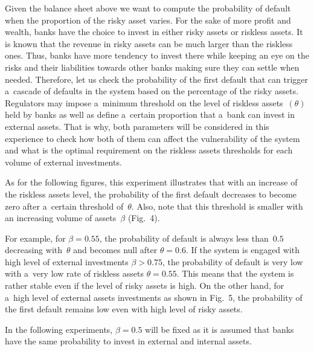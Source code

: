 \begin{multicols}{2}
\noindent
Given the balance sheet above we want to compute the probability of default when 
the proportion of the risky asset varies.
For the sake of more profit and wealth, banks have the choice to invest in 
either risky assets or riskless assets. It is known that the revenue in risky 
assets can be much larger than the riskless ones. Thus, banks have more tendency to 
invest there while keeping an eye on the risks and their liabilities towards 
other banks making sure they can settle when needed. Therefore, let us check 
the probability of the first default that can trigger a~cascade of defaults in the 
system based on the percentage of the risky assets. Regulators may impose 
a~minimum threshold on the level of riskless assets~$(\theta)$ held by banks as 
well as define a~certain proportion that a~bank can invest in  external assets. 
That is why, both parameters will be considered in this experience to check how 
both of them can affect the vulnerability of the system and what is the optimal 
requirement on the riskless assets thresholds for each volume of external 
investments.

As for the following figures, this experiment illustrates that with an increase 
of the riskless assets level, the probability of the first default decreases to 
become zero after a~certain threshold of~$\theta.$
Also, note that this threshold is smaller with an increasing volume of 
assets~$\beta$ (Fig.~4).

For example, for $\beta = 0.55 $, the probability of default is always less 
than~$0.5$ decreasing with~$\theta$ and becomes null after $\theta =0.6$. If the 
system is engaged with high level of external investments $\beta > 0.75 $, the 
probability of default is very low with a~very low rate of riskless assets 
$\theta = 0.55$. This means that the system is rather stable even if the level 
of risky assets is high. On the other hand, for a~high level of external assets 
investments as shown in Fig.~5, the probability of the first default 
remains low even with high level of risky assets.

   



In the following experiments,  $\beta=0.5 $  will be fixed as it is assumed that banks 
have the same probability to invest in external and internal assets. 

\pagebreak

\end{multicols}

